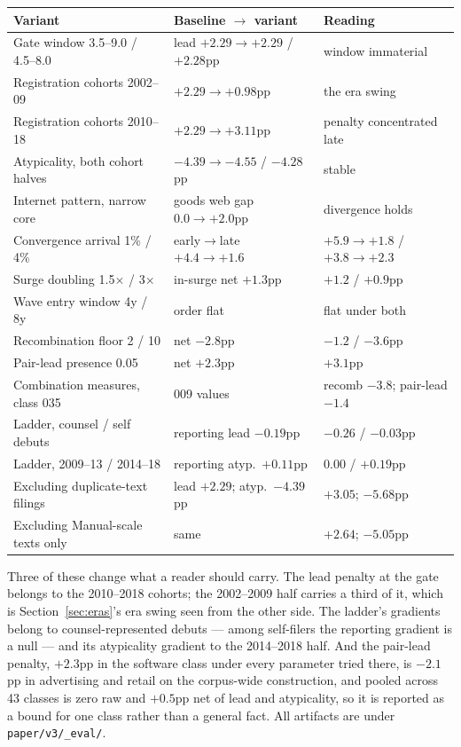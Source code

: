 \begin{center}\small
\begin{tabular}{lll}
\toprule
Variant & Baseline $\to$ variant & Reading \\
\midrule
Gate window 3.5--9.0 / 4.5--8.0 & lead $+2.29 \to +2.29$ / $+2.28$pp & window immaterial \\
Registration cohorts 2002--09 & $+2.29 \to +0.98$pp & the era swing \\
Registration cohorts 2010--18 & $+2.29 \to +3.11$pp & penalty concentrated late \\
Atypicality, both cohort halves & $-4.39 \to -4.55$ / $-4.28$pp & stable \\
Internet pattern, narrow core & goods web gap $0.0 \to +2.0$pp & divergence holds \\
Convergence arrival 1\% / 4\% & early$\to$late $+4.4\to+1.6$ & $+5.9\to+1.8$ / $+3.8\to+2.3$ \\
Surge doubling 1.5$\times$ / 3$\times$ & in-surge net $+1.3$pp & $+1.2$ / $+0.9$pp \\
Wave entry window 4y / 8y & order flat & flat under both \\
Recombination floor 2 / 10 & net $-2.8$pp & $-1.2$ / $-3.6$pp \\
Pair-lead presence 0.05 & net $+2.3$pp & $+3.1$pp \\
Combination measures, class 035 & 009 values & recomb $-3.8$; pair-lead $-1.4$ \\
Ladder, counsel / self debuts & reporting lead $-0.19$pp & $-0.26$ / $-0.03$pp \\
Ladder, 2009--13 / 2014--18 & reporting atyp.\ $+0.11$pp & $0.00$ / $+0.19$pp \\
Excluding duplicate-text filings & lead $+2.29$; atyp.\ $-4.39$pp & $+3.05$; $-5.68$pp \\
Excluding Manual-scale texts only & same & $+2.64$; $-5.05$pp \\
\bottomrule
\end{tabular}
\end{center}

\noindent Three of these change what a reader should carry. The lead
penalty at the gate belongs to the 2010--2018 cohorts; the 2002--2009 half
carries a third of it, which is Section~\ref{sec:eras}'s era swing seen
from the other side. The ladder's gradients belong to counsel-represented
debuts --- among self-filers the reporting gradient is a null --- and its
atypicality gradient to the 2014--2018 half. And the pair-lead penalty,
$+2.3$pp in the software class under every parameter tried there, is
$-2.1$pp in advertising and retail on the corpus-wide construction, and
pooled across 43 classes is zero raw and $+0.5$pp net of lead and
atypicality, so it is reported as a bound for one class rather than a
general fact. All artifacts are under
\texttt{paper/v3/\_eval/}.

